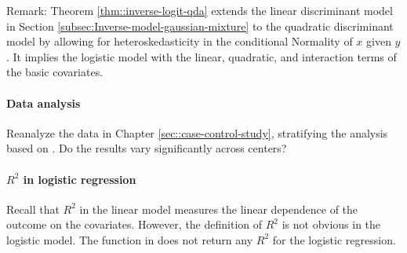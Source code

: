  


Remark: Theorem \ref{thm::inverse-logit-qda} extends the linear discriminant model in Section \ref{subsec:Inverse-model-gaussian-mixture} to the quadratic discriminant model by allowing for heteroskedasticity in the conditional Normality of $x$ given $y$ \citep{cornfield1962joint}. It implies the logistic model with the linear, quadratic, and interaction terms of the basic covariates. 

 


\paragraph{Data analysis}\label{hw17::case-control-data-analysis}

Reanalyze the data in Chapter \ref{sec::case-control-study}, stratifying the analysis based on . Do the results vary significantly across centers?




\paragraph{$R^2$ in logistic regression}\label{hw17::r2-logistic}


Recall that $R^2$ in the linear model measures the linear dependence of the outcome on the covariates. 
However, the definition of $R^2$ is not obvious in the logistic model. The  function in  does not return any $R^2$ for the logistic regression. 

